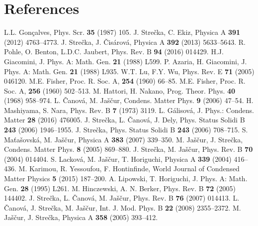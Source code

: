 \documentclass[final,5p,times,sort&compress]{elsarticle}
\begin{document}
\section*{References}

\begin{thebibliography}{50}
L.L. Gon\c{c}alves, Phys. Scr. {\bf 35} (1987) 105.
J. Stre\v{c}ka, C. Ekiz, Physica A {\bf 391} (2012) 4763--4773.
J. Stre\v{c}ka, J. \v{C}is\'arov\'a, Physica A {\bf 392} (2013) 5633--5643.
R. Pohle, O. Benton, L.D.C. Jaubert, Phys. Rev. B {\bf 94} (2016) 014429.
H.J. Giacomini, J. Phys. A: Math. Gen. {\bf 21} (1988) L599.
P. Azaria, H. Giacomini, J. Phys. A: Math. Gen. {\bf 21} (1988) L935.
W.T. Lu, F.Y. Wu, Phys. Rev. E {\bf 71} (2005) 046120.
M.E. Fisher, Proc. R. Soc. A, {\bf 254} (1960) 66--85.
M.E. Fisher, Proc. R. Soc. A, {\bf 256} (1960) 502--513.
M. Hattori, H. Nakano, Prog. Theor. Phys. {\bf 40} (1968) 958--974.
L. \v{C}anov\'a, M. Ja\v{s}\v{c}ur, Condens. Matter Phys. {\bf 9} (2006) 47--54.
H. Mashiyama, S. Nara, Phys. Rev. B {\bf 7} (1973) 3119.
L. G\'alisov\'a, J. Phys.: Condens. Matter {\bf 28} (2016) 476005.
J. Stre\v{c}ka, L. \v{C}anov\'a, J. Dely, Phys. Status Solidi B {\bf 243} (2006) 1946--1955.
J. Stre\v{c}ka, Phys. Status Solidi B {\bf 243} (2006) 708--715.
S. Ma\v{t}a\v{s}ovsk\'a, M. Ja\v{s}\v{c}ur, Physica A {\bf 383} (2007) 339--350.
M. Ja\v{s}\v{c}ur, J. Stre\v{c}ka, Condens. Matter Phys. {\bf 8} (2005) 869--880.
J. Stre\v{c}ka, M. Ja\v{s}\v{c}ur, Phys. Rev. B {\bf 70} (2004) 014404.
S. Lackov\'a, M. Ja\v{s}\v{c}ur, T. Horiguchi, Physica A {\bf 339} (2004) 416--436.
M. Karimou, R. Yessoufou, F. Hontinfinde, World Journal of Condensed Matter Physics {\bf 5} (2015) 187--200.
A. Lipowski, T. Horiguchi, J. Phys. A: Math. Gen. {\bf 28} (1995) L261.
M. Hinczewski, A. N. Berker, Phys. Rev. B {\bf 72} (2005) 144402.
J. Stre\v{c}ka, L. \v{C}anov\'a, M. Ja\v{s}\v{c}ur, Phys. Rev. B {\bf 76} (2007) 014413.
L. \v{C}anov\'a, J. Stre\v{c}ka, M. Ja\v{s}\v{c}ur, Int. J. Mod. Phys. B {\bf 22} (2008) 2355--2372.
M. Ja\v{s}\v{c}ur, J. Stre\v{c}ka, Physica A {\bf 358} (2005) 393--412.

\end{thebibliography}
\end{document}

